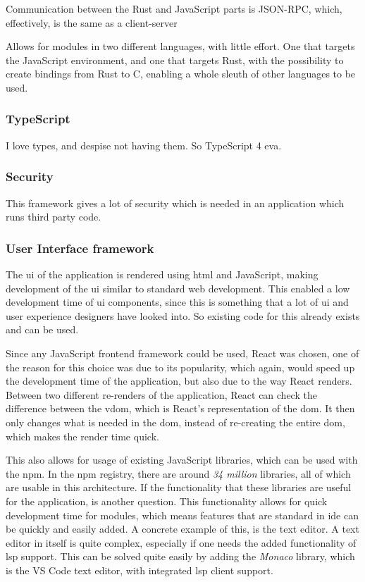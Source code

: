 Communication between the Rust and JavaScript parts is JSON-RPC, which,
effectively, is the same as a client-server

Allows for modules in two different languages, with little effort. One that
targets the JavaScript environment, and one that targets Rust, with the
possibility to create bindings from Rust to C, enabling a whole sleuth of other
languages to be used.

\subsubsection{TypeScript}

I love types, and despise not having them. So TypeScript 4 eva.

\subsubsection{Security}

This framework gives a lot of security which is needed in an
application which runs third party code.

\subsubsection{User Interface framework}

The \gls{ui} of the application is rendered using \gls{html} and JavaScript,
making development of the \gls{ui} similar to standard web development. This
enabled a low development time of \gls{ui} components, since this is something
that a lot of \gls{ui} and user experience designers have looked into. So
existing code for this already exists and can be used.

Since any JavaScript frontend framework could be used, React was chosen, one of
the reason for this choice was due to its popularity, which again, would speed
up the development time of the application, but also due to the way React
renders. Between two different re-renders of the application, React can check
the difference between the \gls{vdom}, which is React's representation of the
\gls{dom}. It then only changes what is needed in the \gls{dom}, instead of
re-creating the entire \gls{dom}, which makes the render time quick.

This also allows for usage of existing JavaScript libraries, which can be used
with the \gls{npm}. In the \gls{npm} registry, there are around
\textit{34 million} libraries, all of which are usable in this architecture. If
the functionality that these libraries are useful for the application, is
another question. This functionality allows for quick development time for
modules, which means features that are standard in \gls{ide} can be quickly and
easily added. A concrete example of this, is the text editor. A text editor in
itself is quite complex, especially if one needs the added functionality of
\gls{lsp} support. This can be solved quite easily by adding the \textit{Monaco}
library, which is the VS Code text editor, with integrated \gls{lsp} client
support.

